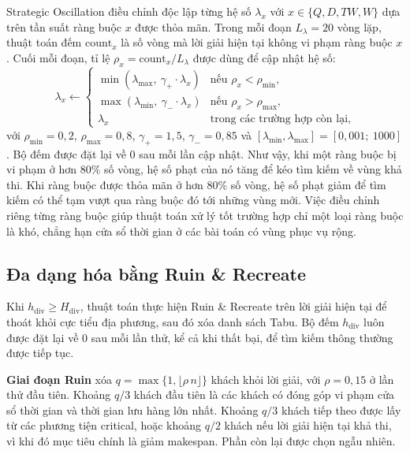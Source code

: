 \documentclass[../DoAn.tex]{subfiles}
\begin{document}
Strategic Oscillation điều chỉnh độc lập từng hệ số $\lambda_x$ với $x \in \{Q, D, TW, W\}$ dựa trên tần suất ràng buộc $x$ được thỏa mãn. Trong mỗi đoạn $L_\lambda = 20$ vòng lặp, thuật toán đếm $\mathrm{count}_x$ là số vòng mà lời giải hiện tại không vi phạm ràng buộc $x$. Cuối mỗi đoạn, tỉ lệ $\rho_x = \mathrm{count}_x / L_\lambda$ được dùng để cập nhật hệ số:
\begin{equation}
\lambda_x \leftarrow \begin{cases}
\min\!\left(\lambda_{\max},\ \gamma_+\cdot\lambda_x\right) & \text{nếu } \rho_x < \rho_{\min}, \\
\max\!\left(\lambda_{\min},\ \gamma_-\cdot\lambda_x\right) & \text{nếu } \rho_x > \rho_{\max}, \\
\lambda_x & \text{trong các trường hợp còn lại,}
\end{cases}
\end{equation}
với $\rho_{\min} = 0{,}2$, $\rho_{\max} = 0{,}8$, $\gamma_+ = 1{,}5$, $\gamma_- = 0{,}85$ và $[\lambda_{\min}, \lambda_{\max}] = [0{,}001;\ 1000]$. Bộ đếm được đặt lại về $0$ sau mỗi lần cập nhật. Như vậy, khi một ràng buộc bị vi phạm ở hơn 80\% số vòng, hệ số phạt của nó tăng để kéo tìm kiếm về vùng khả thi. Khi ràng buộc được thỏa mãn ở hơn 80\% số vòng, hệ số phạt giảm để tìm kiếm có thể tạm vượt qua ràng buộc đó tới những vùng mới. Việc điều chỉnh riêng từng ràng buộc giúp thuật toán xử lý tốt trường hợp chỉ một loại ràng buộc là khó, chẳng hạn cửa sổ thời gian ở các bài toán có vùng phục vụ rộng.

\subsection{Đa dạng hóa bằng Ruin \& Recreate}
\label{subsec:rr}

Khi $h_{\text{div}} \geq H_{\text{div}}$, thuật toán thực hiện Ruin \& Recreate trên lời giải hiện tại để thoát khỏi cực tiểu địa phương, sau đó xóa danh sách Tabu. Bộ đếm $h_{\text{div}}$ luôn được đặt lại về $0$ sau mỗi lần thử, kể cả khi thất bại, để tìm kiếm thông thường được tiếp tục.

\textbf{Giai đoạn Ruin} xóa $q = \max\{1, \lfloor\rho\, n\rfloor\}$ khách khỏi lời giải, với $\rho = 0{,}15$ ở lần thử đầu tiên. Khoảng $q/3$ khách đầu tiên là các khách có đóng góp vi phạm cửa sổ thời gian và thời gian lưu hàng lớn nhất. Khoảng $q/3$ khách tiếp theo được lấy từ các phương tiện critical, hoặc khoảng $q/2$ khách nếu lời giải hiện tại khả thi, vì khi đó mục tiêu chính là giảm makespan. Phần còn lại được chọn ngẫu nhiên.
\end{document}
